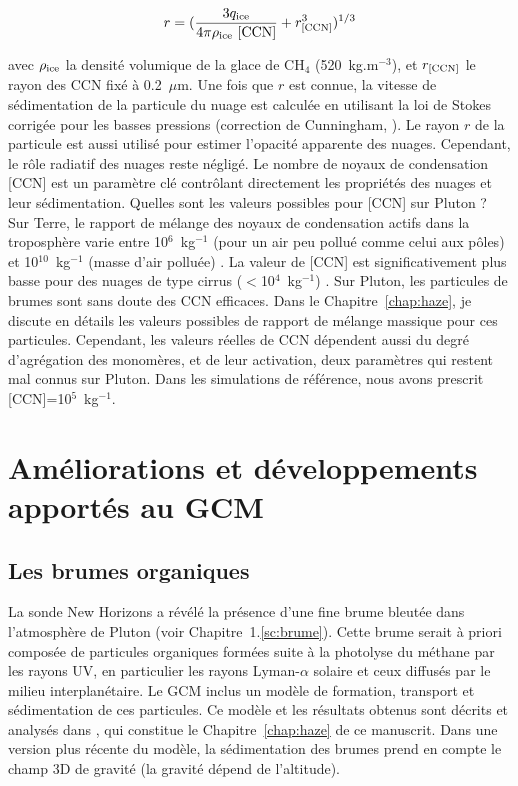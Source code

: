 \begin{equation}
r=  (\frac{3 q_{\mbox{\scriptsize ice}}}{4\pi \rho_{\mbox{\scriptsize ice}} \ \mbox{[CCN]} } +
r_{\mbox{\scriptsize [CCN]}}^3)^{1/3}
\end{equation}

avec $\rho_{\mbox{\scriptsize ice}}$ la densité volumique de la glace de CH$_4$ (520~kg.m$^{-3}$), et $r_{\mbox{\scriptsize [CCN]}}$ le rayon des CCN fixé à 0.2~$\mu$m. 
Une fois que $r$ est connue, la vitesse de sédimentation de la particule du nuage est calculée en utilisant la loi de Stokes corrigée pour les basses pressions (correction de Cunningham, \citet{Ross:78}). 
Le rayon $r$ de la particule est aussi utilisé pour estimer l’opacité apparente des nuages. Cependant, le rôle radiatif des nuages reste négligé. 
Le nombre de noyaux de condensation [CCN] est un paramètre clé contrôlant directement les propriétés des nuages et leur sédimentation. Quelles sont les valeurs possibles pour [CCN] sur Pluton ?
Sur Terre, le rapport de mélange des noyaux de condensation actifs dans la troposphère varie entre 10$^{6}$~kg$^{-1}$ (pour un air peu pollué comme celui aux pôles) et 10$^{10}$~kg$^{-1}$ (masse d’air polluée) \citep{HudsYum:02,Andr:09}. La valeur de [CCN] est significativement plus basse pour des nuages de type cirrus ($<$10$^{4}$~kg$^{-1}$) \citep{Demo:03}. Sur Pluton, les particules de brumes sont sans doute des CCN efficaces. Dans le Chapitre~\ref{chap:haze}, je discute en détails les valeurs possibles de rapport de mélange massique pour ces particules. Cependant, les valeurs réelles de CCN dépendent aussi du degré d’agrégation des monomères, et de leur activation, deux paramètres qui restent mal connus sur Pluton. Dans les simulations de référence, nous avons prescrit [CCN]=10$^{5}$~kg$^{-1}$.

\section{Améliorations et développements apportés au GCM}
\label{sc:dev1}

\subsection{Les brumes organiques}

La sonde New Horizons a révélé la présence d’une fine brume bleutée dans l’atmosphère de Pluton (voir Chapitre~1.\ref{sc:brume}). Cette brume serait à priori composée de particules organiques formées suite à la photolyse du méthane par les rayons UV, en particulier les rayons Lyman-$\alpha$ solaire et ceux diffusés par le milieu interplanétaire.  Le GCM inclus un modèle de formation, transport et sédimentation de ces particules. Ce modèle et les résultats obtenus sont décrits et analysés dans \citet{BertForg:17}, qui constitue le Chapitre~\ref{chap:haze} de ce manuscrit. 
Dans une version plus récente du modèle, la sédimentation des brumes prend en compte le champ 3D de gravité (la gravité dépend de l’altitude).


